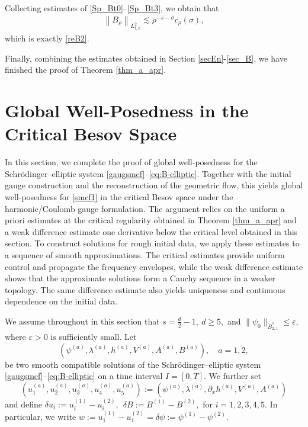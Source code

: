 \documentclass[11pt,letterpaper,reqno]{amsart}
\numberwithin{equation}{section}
\theoremstyle{definition}
\theoremstyle{remark}
\begin{document}
 

Collecting estimates of \eqref{Sp_Bt0}--\eqref{Sp_Bt3},  we  obtain that
\begin{align*}
	\left\|  B_\rho\right\|_{L^2_{t,x}}\lesssim \rho^{-s-\sigma} c_\rho(\sigma),
\end{align*}
which is exactly \eqref{reB2}. 

Finally, combining the estimates obtained in Section \ref{secEn}-\ref{sec_B}, we have finished the proof of Theorem \ref{thm_a_apr}.


\section{Global Well-Posedness in the Critical Besov Space} \label{sec.wpd.5}
In this section, we complete the proof of global well-posedness for the Schr\"odinger--elliptic system
\eqref{gaugsmcf}--\eqref{eq:B-elliptic}. Together with the initial gauge construction and the reconstruction of the geometric flow, this yields global well-posedness for \eqref{smcf1} in the critical Besov space under the harmonic/Coulomb gauge formulation. 
The argument relies on the uniform a priori estimates at the critical regularity obtained in Theorem \ref{thm_a_apr} and a weak difference estimate one derivative below the critical level obtained in this section. To construct solutions for rough initial data, we apply these estimates to a sequence of smooth approximations. The critical estimates provide uniform control and propagate the frequency envelopes, while the weak difference estimate shows that the approximate solutions form a Cauchy sequence in a weaker topology. The same difference estimate also yields uniqueness and continuous dependence on the initial data.

We assume throughout in this section that
\(
s=\frac d2-1,~
d\geq 5,
\)
and  
\(
\|\psi_0\|_{\dot B^s_{2,1}}
\leq \varepsilon,
\)
where \(\varepsilon>0\) is sufficiently small. Let 
\[ \left( \psi^{(a)}, \lambda^{(a)}, h^{(a)}, V^{(a)}, A^{(a)}, B^{(a)} \right), \quad a=1,2, \] 
be two smooth compatible solutions of the Schr\"odinger--elliptic system \eqref{gaugsmcf}--\eqref{eq:B-elliptic} on a time interval \( I=[0,T]. \)
We further set
\[
\left(
u_1^{(a)},
u_2^{(a)},
u_3^{(a)},
u_4^{(a)},
u_5^{(a)}
\right):=\left(
\psi^{(a)},
\lambda^{(a)},
 \partial_x h^{(a)},
V^{(a)},
A^{(a)}
\right)
\]
 and define
\(
\delta u_i:=u_i^{(1)}-u_i^{(2)},~~\delta B:=B^{(1)}-B^{(2)},
\)
for \(i=1,2,3,4,5\). 
 In particular, we write 
 \(
w:=
u_1^{(1)}-u_1^{(2)}=\delta\psi:=\psi^{(1)}-\psi^{(2)}.
\)
\end{document}
